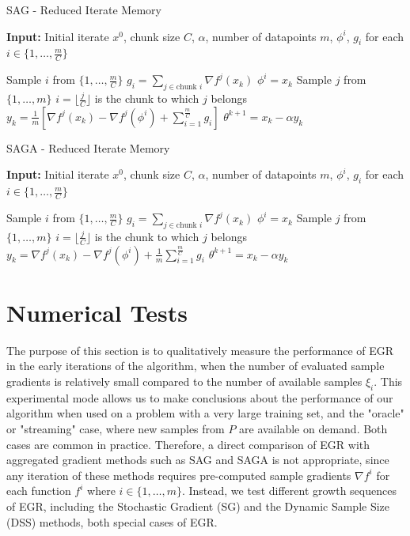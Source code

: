 \documentclass[11pt]{article}
\begin{document}
   \begin{algorithm}
   	[H] 
   	\caption{SAG - Reduced Iterate Memory}
   	\label{alg:sag-reduced-iterate-memory}
   	{\bf Input:} Initial iterate $x^0$, chunk size $C$, $\alpha$, number of datapoints $m$, $\phi^i$, $g_i$  for each $i \in \{ 1, \ldots,\frac{m}{C} \}$
   	\begin{algorithmic}
   		[1] 
   		\State Sample $i$ from $\{ 1, \ldots,\frac{m}{C} \}$
   		\State $g_i = \sum_{j \in \mbox{chunk } i } \nabla f^{j}(x_k)$
   		\State $\phi^i =x_k$
		\EndIf
   		\State Sample $j$ from $\{ 1, \ldots, m \}$
   		\State $i = \lfloor \frac{j}{C} \rfloor$ is the chunk to which $j$ belongs
		\State $y_k= \frac{1}{m} \left[  \nabla f^j(x_k) - \nabla f^j(\phi^i)  + \sum_{i=1}^{\frac{m}{C}}   g_i\right]$
   		\State $\theta^{k+1} = x_k - \alpha y_k$ 
   		\EndLoop 
   	\end{algorithmic}
   \end{algorithm}
  
  \begin{algorithm}
  	[H] 
  	\caption{SAGA - Reduced Iterate Memory}
  	\label{alg:saga-reduced-iterate-memory}
  	{\bf Input:} Initial iterate $x^0$, chunk size $C$, $\alpha$, number of datapoints $m$, $\phi^i$, $g_i$  for each $i \in \{ 1, \ldots,\frac{m}{C} \}$
  	\begin{algorithmic}
  		[1] 
  		\State Sample $i$ from $\{ 1, \ldots,\frac{m}{C} \}$
  		\State $g_i = \sum_{j \in \mbox{chunk } i } \nabla f^{j}(x_k)$
  		\State $\phi^i =x_k$
	\EndIf
  		\State Sample $j$ from $\{ 1, \ldots, m \}$
  		\State $i = \lfloor \frac{j}{C} \rfloor$ is the chunk to which $j$ belongs
	\State $y_k=  \nabla f^j(x_k) - \nabla f^j(\phi^i)  + \frac{1}{m} \sum_{i=1}^{\frac{m}{C}}   g_i$
  		\State $\theta^{k+1} = x_k - \alpha y_k$ 
  		\EndLoop 
  	\end{algorithmic}
  \end{algorithm}
  
\section{Numerical Tests} \label{numerical}
 

 
 The purpose of this section is to qualitatively measure the performance of EGR in the early iterations of the algorithm, when the number of evaluated sample gradients is relatively small compared to the number of available samples $\xi_i$. This experimental mode allows us to make conclusions about the performance of our algorithm when used on a problem with a very large training set, and the "oracle" or "streaming" case,  where new samples from $P$ are available on demand. Both cases are common in practice. Therefore, a direct comparison of EGR with aggregated gradient methods such as SAG and SAGA is not appropriate, since any iteration of these methods requires pre-computed sample gradients $\nabla f^i$ for each function $f^i$ where $i \in  \{1 , \ldots, m \} $. Instead, we test different growth sequences of EGR, including the Stochastic Gradient (SG) and the Dynamic Sample Size (DSS) methods, both special cases of EGR.
\end{document}
